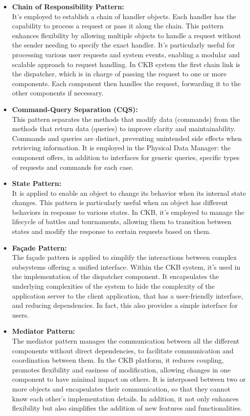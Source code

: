 \begin{itemize}
    \item \textbf{Chain of Responsibility Pattern:} \\
    It's employed to establish a chain of handler objects. Each handler has the capability to process a request or pass it along the chain. This pattern enhances flexibility by allowing multiple objects to handle a request without the sender needing to specify the exact handler. It’s particularly useful for processing various user requests and system events, enabling a modular and scalable approach to request handling. In CKB system the first chain link is the dispatcher, which is in charge of passing the request to one or more components. Each component then handles the request, forwarding it to the other components if necessary.

    \item \textbf{Command-Query Separation (CQS):} \\
    This pattern separates the methods that modify data (commands) from the methods that return data (queries) to improve clarity and maintainability. Commands and queries are distinct, preventing unintended side effects when retrieving information. It is employed in the Physical Data Manager: the component offers, in addition to interfaces for generic queries, specific types of requests and commands for each case. 
    
    \item \textbf{State Pattern:} \\
    It is applied to enable an object to change its behavior when its internal state changes. This pattern is particularly useful when an object has different behaviors in response to various states. In CKB, it’s employed to manage the lifecycle of battles and tournaments, allowing them to transition between states and modify the response to certain requests based on them. 

    \item \textbf{Façade Pattern:} \\
    The façade pattern is applied to simplify the interactions between complex subsystems offering a unified interface. Within the CKB system, it’s used in the implementation of the dispatcher component. It encapsulates the underlying complexities of the system to hide the complexity of the application server to the client application, that has a user-friendly interface, and reducing dependencies. In fact, this also provides a simple interface for users.

    \item \textbf{Mediator Pattern:} \\
    The mediator pattern manages the communication between all the different components without direct dependencies, to facilitate communication and coordination between them. In the CKB platform, it reduces coupling, promotes flexibility and easiness of modification, allowing changes in one component to have minimal impact on others. It is interposed between two or more objects and encapsulates their communication, so that they cannot know each other’s implementation details. In addition, it not only enhances flexibility but also simplifies the addition of new features and functionalities.


\end{itemize}
